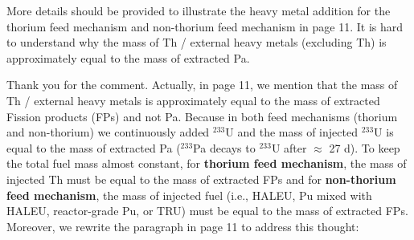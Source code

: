 \documentclass[answers,11pt]{exam}
\begin{document}
\begin{questions}
        \question More details should be provided to illustrate the heavy metal addition for the thorium feed mechanism and non-thorium feed mechanism in page 11. It is hard to understand why the mass of Th / external heavy metals (excluding Th) is approximately equal to the mass of extracted Pa.
        \begin{solution}
               Thank you for the comment. Actually, in page 11, we mention 
               that the mass of Th / external heavy metals is approximately 
               equal to the mass of extracted Fission products (FPs) and not 
               Pa. Because in both feed mechanisms (thorium and non-thorium) 
               we continuously added $^{233}$U and the mass of injected 
               $^{233}$U is equal to the mass of extracted Pa ($^{233}$Pa 
               decays to $^{233}$U after $\approx$ 27 d). To keep the total 
               fuel mass almost constant, for \textbf{thorium feed mechanism}, 
               the mass of injected Th must be equal to the mass of extracted 
               FPs and for \textbf{non-thorium feed mechanism}, the mass of 
               injected fuel (i.e., HALEU, Pu mixed with HALEU, reactor-grade 
               Pu, or TRU) must be equal to the mass of extracted FPs.
               Moreover, we rewrite the paragraph in page 11 to address this 
               thought:\\
               

\end{solution}
\end{questions}
\end{document}
